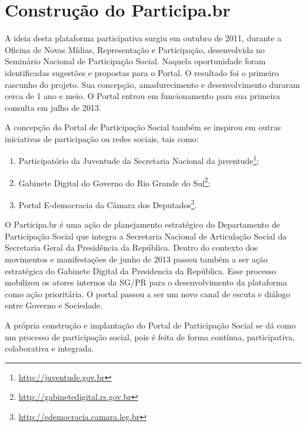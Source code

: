 \documentclass{article}
\begin{document}
\section{Construção do Participa.br}

%
%

A ideia desta plataforma participativa surgiu em outubro de 2011, durante a
Oficina de Novas Mídias, Representação e Participação, desenvolvida no
Seminário Nacional de Participação Social. Naquela oportunidade foram
identificadas sugestões e propostas para o Portal. O resultado foi o primeiro
rascunho do projeto. Sua concepção, amadurecimento e desenvolvimento duraram
cerca de 1 ano e meio. O Portal entrou em funcionamento para sua primeira
consulta em julho de 2013.

A concepção do Portal de Participação Social também se inspirou em outras
iniciativas de participação ou redes sociais, tais como: 

\begin{enumerate}
  \item Participatório da Juventude da Secretaria Nacional da juventude\footnote{\url{http://juventude.gov.br}};
  \item Gabinete Digital do Governo do Rio Grande do Sul\footnote{\url{http://gabinetedigital.rs.gov.br}};
  \item Portal E-democracia da Câmara dos Deputados\footnote{\url{http://edemocracia.camara.leg.br}}.
\end{enumerate}

O Participa.br é uma ação de planejamento estratégico do Departamento de
Participação Social que integra a Secretaria Nacional de Articulação Social da
Secretaria Geral da Presidência da República. Dentro do contexto dos movimentos
e manifestações de junho de 2013 passou também a ser ação estratégica do
Gabinete Digital da Presidencia da República. Esse processo mobilizou os atores
internos da SG/PR para o desenvolvimento da plataforma como ação prioritária. O
portal passou a ser um novo canal de escuta e diálogo entre Governo e
Sociedade.

A própria construção e implantação do Portal de Participação Social se dá como
um processo de participação social, pois é feita de forma contínua,
participativa, colaborativa e integrada. 
\end{document}
